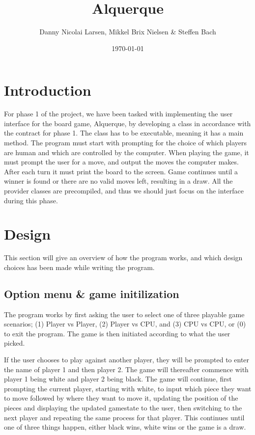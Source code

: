 \documentclass[12pt, a4paper]{article}
\title{Alquerque}
\author{Danny Nicolai Larsen, Mikkel Brix Nielsen \& Steffen Bach}
\date{\today}
\begin{document}
	\maketitle
	\newpage
	\tableofcontents
	\newpage
	\section{Introduction}
	For phase 1 of the project, we have been tasked with implementing the user interface for the board game, Alquerque, by developing a class in accordance with the contract for phase 1. The class has to be executable, meaning it has a main method. The program must start with prompting for the choice of which players are human and which are controlled by the computer. When playing the game, it must prompt the user for a move, and output the moves the computer makes. After each turn it must print the board to the screen. Game continues until a winner is found or there are no valid moves left, resulting in a draw. All the provider classes are precompiled, and thus we should just focus on the interface during this phase.
	
	\section{Design}
	\label{design}
	This section will give an overview of how the program works, and which design choices has been made while writing the program.
	
	\subsection{Option menu \& game initilization}
	The program works by first asking the user to select one of three playable game scenarios; (1) Player vs Player, (2) Player vs CPU, and (3) CPU vs CPU, or (0) to exit the program. The game is then initiated according to what the user picked.
	
	If the user chooses to play against another player, they will be prompted to enter the name of player 1 and then player 2. The game will thereafter commence with player 1 being white and player 2 being black. The game will continue, first prompting the current player, starting with white, to input which piece they want to move followed by where they want to move it, updating the position of the pieces and displaying the updated gamestate to the user, then switching to the next player and repeating the same process for that player. This continues until one of three things happen, either black wins, white wins or the game is a draw. 
	
\end{document}
